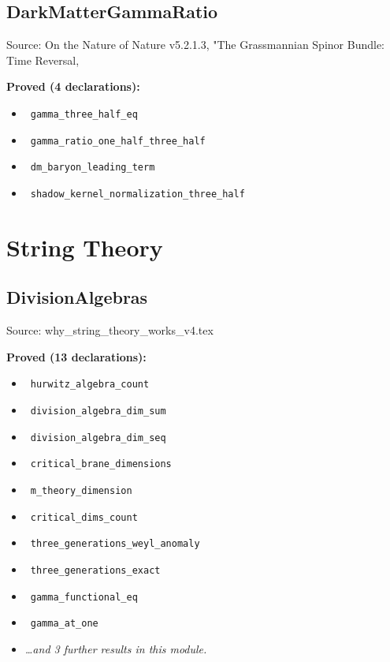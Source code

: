 \documentclass{report}
\theoremstyle{definition}
\begin{document}
\begin{itemize}
\begin{itemize}
\subsection{DarkMatterGammaRatio}
Source: On the Nature of Nature v5.2.1.3, "The Grassmannian Spinor Bundle: Time Reversal,

\noindent\textbf{Proved (4 declarations):}
\begin{itemize}
  \item {}\leanok\ \texttt{gamma\_three\_half\_eq}
  \item {}\leanok\ \texttt{gamma\_ratio\_one\_half\_three\_half}
  \item {}\leanok\ \texttt{dm\_baryon\_leading\_term}
  \item {}\leanok\ \texttt{shadow\_kernel\_normalization\_three\_half}
\end{itemize}

\section{String Theory}

\subsection{DivisionAlgebras}
Source: why\_string\_theory\_works\_v4.tex

\noindent\textbf{Proved (13 declarations):}
\begin{itemize}
  \item {}\leanok\ \texttt{hurwitz\_algebra\_count}
  \item {}\leanok\ \texttt{division\_algebra\_dim\_sum}
  \item {}\leanok\ \texttt{division\_algebra\_dim\_seq}
  \item {}\leanok\ \texttt{critical\_brane\_dimensions}
  \item {}\leanok\ \texttt{m\_theory\_dimension}
  \item {}\leanok\ \texttt{critical\_dims\_count}
  \item {}\leanok\ \texttt{three\_generations\_weyl\_anomaly}
  \item {}\leanok\ \texttt{three\_generations\_exact}
  \item {}\leanok\ \texttt{gamma\_functional\_eq}
  \item {}\leanok\ \texttt{gamma\_at\_one}
  \item \emph{\ldots and 3 further results in this module.}
\end{itemize}


\end{itemize}
\end{itemize}
\end{document}
